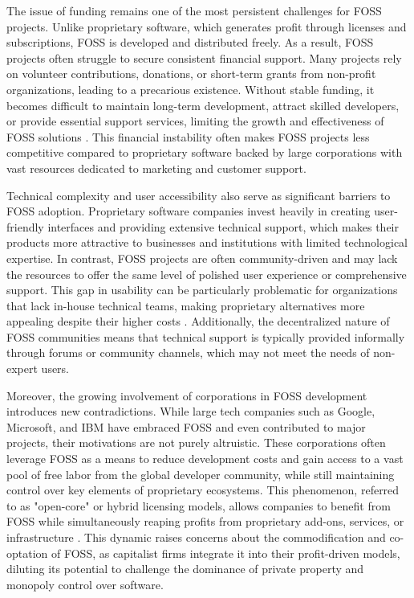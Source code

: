 \begin{refsection}
The issue of funding remains one of the most persistent challenges for FOSS projects. Unlike proprietary software, which generates profit through licenses and subscriptions, FOSS is developed and distributed freely. As a result, FOSS projects often struggle to secure consistent financial support. Many projects rely on volunteer contributions, donations, or short-term grants from non-profit organizations, leading to a precarious existence. Without stable funding, it becomes difficult to maintain long-term development, attract skilled developers, or provide essential support services, limiting the growth and effectiveness of FOSS solutions \cite[pp.~68-70]{raymond2022}. This financial instability often makes FOSS projects less competitive compared to proprietary software backed by large corporations with vast resources dedicated to marketing and customer support.

Technical complexity and user accessibility also serve as significant barriers to FOSS adoption. Proprietary software companies invest heavily in creating user-friendly interfaces and providing extensive technical support, which makes their products more attractive to businesses and institutions with limited technological expertise. In contrast, FOSS projects are often community-driven and may lack the resources to offer the same level of polished user experience or comprehensive support. This gap in usability can be particularly problematic for organizations that lack in-house technical teams, making proprietary alternatives more appealing despite their higher costs \cite[pp.~25-27]{fitzgerald2007}. Additionally, the decentralized nature of FOSS communities means that technical support is typically provided informally through forums or community channels, which may not meet the needs of non-expert users.

Moreover, the growing involvement of corporations in FOSS development introduces new contradictions. While large tech companies such as Google, Microsoft, and IBM have embraced FOSS and even contributed to major projects, their motivations are not purely altruistic. These corporations often leverage FOSS as a means to reduce development costs and gain access to a vast pool of free labor from the global developer community, while still maintaining control over key elements of proprietary ecosystems. This phenomenon, referred to as "open-core" or hybrid licensing models, allows companies to benefit from FOSS while simultaneously reaping profits from proprietary add-ons, services, or infrastructure \cite[pp.~94-96]{weber2004}. This dynamic raises concerns about the commodification and co-optation of FOSS, as capitalist firms integrate it into their profit-driven models, diluting its potential to challenge the dominance of private property and monopoly control over software.


\end{refsection}
